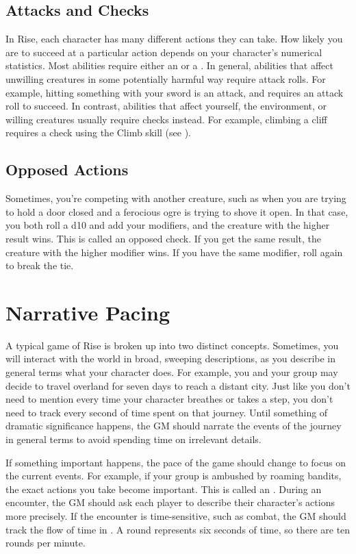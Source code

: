     \subsection{Attacks and Checks}
        In Rise, each character has many different actions they can take.
        How likely you are to succeed at a particular action depends on your character's numerical statistics.
        Most abilities require either an  or a .
        In general, abilities that affect unwilling creatures in some potentially harmful way require attack rolls.
        For example, hitting something with your sword is an attack, and requires an attack roll to succeed.
        In contrast, abilities that affect yourself, the environment, or willing creatures usually require checks instead.
        For example, climbing a cliff requires a check using the Climb skill (see ).

    \subsection{Opposed Actions}
        Sometimes, you're competing with another creature, such as when you are trying to hold a door closed and a ferocious ogre is trying to shove it open.
        In that case, you both roll a d10 and add your modifiers, and the creature with the higher result wins.
        This is called an opposed check.
        If you get the same result, the creature with the higher modifier wins.
        If you have the same modifier, roll again to break the tie.

\section{Narrative Pacing}
    A typical game of Rise is broken up into two distinct concepts.
    Sometimes, you will interact with the world in broad, sweeping descriptions, as you describe in general terms what your character does.
    For example, you and your group may decide to travel overland for seven days to reach a distant city.
    Just like you don't need to mention every time your character breathes or takes a step, you don't need to track every second of time spent on that journey.
    Until something of dramatic significance happens, the GM should narrate the events of the journey in general terms to avoid spending time on irrelevant details.

    If something important happens, the pace of the game should change to focus on the current events.
    For example, if your group is ambushed by roaming bandits, the exact actions you take become important.
    This is called an .
    During an encounter, the GM should ask each player to describe their character's actions more precisely.
    If the encounter is time-sensitive, such as combat, the GM should track the flow of time in .
    A round represents six seconds of time, so there are ten rounds per minute.

